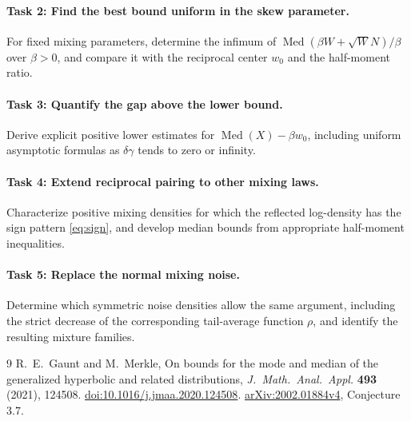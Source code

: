 \documentclass[11pt]{article}
\newcommand{\Med}{\operatorname{Med}}
\begin{document}
\paragraph{Task 2: Find the best bound uniform in the skew parameter.}
For fixed mixing parameters, determine the infimum of
\(\Med(\beta W+\sqrt W N)/\beta\) over \(\beta>0\), and compare it
with the reciprocal center \(w_0\) and the half-moment ratio.

\paragraph{Task 3: Quantify the gap above the lower bound.}
Derive explicit positive lower estimates for
\(\Med(X)-\beta w_0\), including uniform asymptotic formulas as
\(\delta\gamma\) tends to zero or infinity.

\paragraph{Task 4: Extend reciprocal pairing to other mixing laws.}
Characterize positive mixing densities for which the reflected
log-density has the sign pattern \eqref{eq:sign}, and develop
median bounds from appropriate half-moment inequalities.

\paragraph{Task 5: Replace the normal mixing noise.}
Determine which symmetric noise densities allow the same argument,
including the strict decrease of the corresponding tail-average
function \(\rho\), and identify the resulting mixture families.

\begin{thebibliography}{9}
R.\ E.\ Gaunt and M.\ Merkle,
On bounds for the mode and median of the generalized hyperbolic and
related distributions,
\emph{J.\ Math.\ Anal.\ Appl.} \textbf{493} (2021), 124508.
\href{https://doi.org/10.1016/j.jmaa.2020.124508}{doi:10.1016/j.jmaa.2020.124508}.
\href{https://arxiv.org/abs/2002.01884}{arXiv:2002.01884v4},
Conjecture 3.7.
\end{thebibliography}
\end{document}
